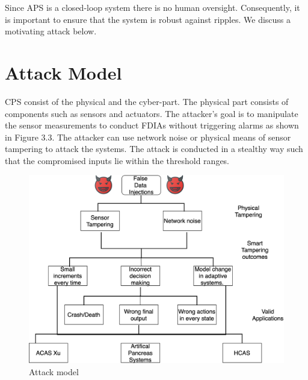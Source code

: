 Since APS is a closed-loop system there is no human oversight. Consequently, it is important to ensure that the system is robust against ripples. We discuss a motivating attack below. 


\section{Attack Model}
CPS consist of the physical and the cyber-part. The physical part consists of components such as sensors and actuators. The attacker's goal is to manipulate the sensor measurements to conduct FDIAs without triggering alarms as shown in Figure 3.3. The attacker can use network noise or physical means of sensor tampering to attack the systems. 
The attack is conducted in a stealthy way such that the compromised inputs lie within the threshold ranges. 
\begin{figure}
	\centering
	\includegraphics[width=0.7\linewidth]{Images/Attackmodelphysical}
	\caption{Attack model}
	\label{fig:attackmodelphysical}
\end{figure}

